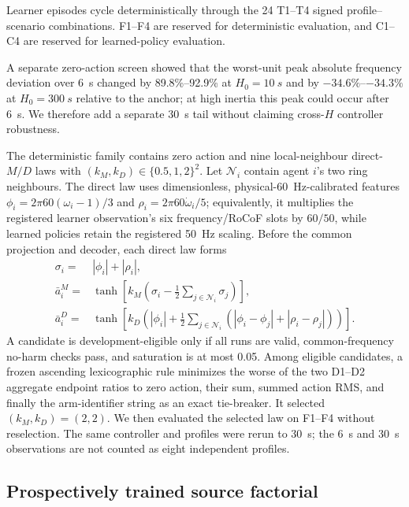 \documentclass[conference,a4paper]{IEEEtran}
\begin{document}
Learner episodes cycle deterministically through the 24 T1--T4 signed
profile--scenario combinations. F1--F4 are reserved for deterministic
evaluation, and C1--C4 are reserved for learned-policy evaluation.

A separate zero-action screen showed that the worst-unit peak absolute
frequency deviation over \SI{6}{s} changed by 89.8\%--92.9\% at
$H_0=\SI{10}{s}$ and by
$-34.6\%$--$-34.3\%$ at $H_0=\SI{300}{s}$ relative to the anchor; at high
inertia this peak could occur after \SI{6}{s}. We therefore add a separate
\SI{30}{s} tail without claiming cross-$H$ controller robustness.

The deterministic family contains zero action and nine local-neighbour
direct-$M/D$ laws with $(k_M,k_D)\in\{0.5,1,2\}^2$. Let $\mathcal N_i$ contain
agent $i$'s two ring neighbours. The direct law uses dimensionless,
physical-\SI{60}{Hz}-calibrated features
$\phi_i=2\pi60(\omega_i-1)/3$ and $\rho_i=2\pi60\dot\omega_i/5$; equivalently,
it multiplies the registered learner observation's six frequency/RoCoF slots by
$60/50$, while learned policies retain the registered \SI{50}{Hz} scaling.
Before the common projection and decoder, each direct law forms
\begin{align}
\sigma_i={}&|\phi_i|+|\rho_i|,\nonumber\\
\bar a_i^M={}&\tanh\!\left[k_M\!\left(\sigma_i-
\frac{1}{2}\sum_{j\in\mathcal N_i}\sigma_j\right)\right],\nonumber\\
\bar a_i^D={}&\tanh\!\left[k_D\!\left(|\phi_i|+
\frac{1}{2}\sum_{j\in\mathcal N_i}
(|\phi_i-\phi_j|+|\rho_i-\rho_j|)\right)\right].
\label{eq:direct_md}
\end{align}
A candidate is development-eligible only if all runs are valid, common-frequency
no-harm checks pass, and saturation is at most 0.05. Among eligible candidates,
a frozen ascending lexicographic rule minimizes the worse of the two D1--D2
aggregate endpoint ratios to zero action, their sum, summed action RMS, and
finally the arm-identifier string as an exact tie-breaker. It selected
$(k_M,k_D)=(2,2)$. We then
evaluated the selected law on F1--F4 without reselection. The same controller
and profiles were rerun to \SI{30}{s}; the \SI{6}{s} and \SI{30}{s}
observations are not counted as eight independent profiles.

\subsection{Prospectively trained source factorial}
\end{document}
